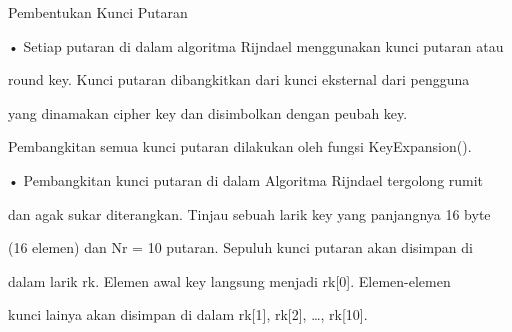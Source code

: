 \documentclass{article}
\begin{document}

Pembentukan Kunci Putaran

• Setiap putaran di dalam algoritma Rijndael menggunakan kunci putaran atau 

round key. Kunci putaran dibangkitkan dari kunci eksternal dari pengguna 

yang dinamakan cipher key dan disimbolkan dengan peubah key. 

Pembangkitan semua kunci putaran dilakukan oleh fungsi KeyExpansion(). 

• Pembangkitan kunci putaran di dalam Algoritma Rijndael tergolong rumit 

dan agak sukar diterangkan. Tinjau sebuah larik key yang panjangnya 16 byte 

(16 elemen) dan Nr = 10 putaran. Sepuluh kunci putaran akan disimpan di 

dalam larik rk. Elemen awal key langsung menjadi rk[0]. Elemen-elemen 

kunci lainya akan disimpan di dalam rk[1], rk[2], …, rk[10].
\end{document}
